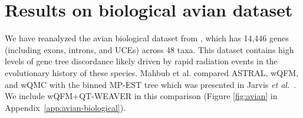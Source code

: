 \documentclass[runningheads]{llncs}
\begin{document}




\section{Results on biological avian dataset}

We have reanalyzed the avian biological dataset from \cite{jarvis2014}, which has 14,446 genes (including exons, introns, and UCEs) across 48 taxa. This dataset contains high levels of gene tree discordance likely driven by rapid radiation events in the evolutionary history of these species. Mahbub et al. \cite{wqfm} compared ASTRAL, wQFM, and wQMC with the binned MP-EST tree which was presented in Jarvis \textit{et al.}~\cite{jarvis2014}. We include wQFM+QT-WEAVER in this comparison (Figure \ref{fig:avian} in Appendix~\ref{app:avian-biological}). %

\end{document}

